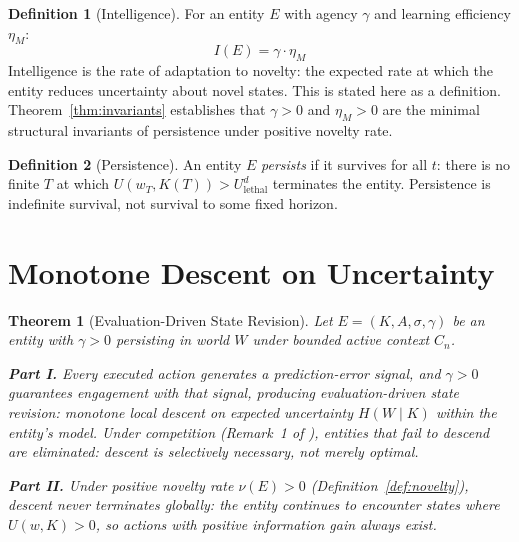 \documentclass[11pt]{article}
\newtheorem{theorem}{Theorem}
\theoremstyle{definition}
\newtheorem{definition}{Definition}
\theoremstyle{remark}
\begin{document}
\begin{definition}[Intelligence]
\label{def:intelligence}
For an entity $E$ with agency $\gamma$ and learning efficiency $\eta_M$:
\[
I(E) = \gamma \cdot \eta_M
\]
Intelligence is the rate of adaptation to novelty: the expected rate at
which the entity reduces uncertainty about novel states. This is stated
here as a definition. Theorem~\ref{thm:invariants} establishes that
$\gamma > 0$ and $\eta_M > 0$ are the minimal structural invariants
of persistence under positive novelty rate.
\end{definition}

\begin{definition}[Persistence]
\label{def:persistence}
An entity $E$ \emph{persists} if it survives for all $t$: there is no
finite $T$ at which $U(w_T, K(T)) > U_{\mathrm{lethal}}^d$ terminates
the entity. Persistence is indefinite survival, not survival to some
fixed horizon.
\end{definition}

\section{Monotone Descent on Uncertainty}
\label{sec:descent}

\begin{theorem}[Evaluation-Driven State Revision]
\label{thm:descent}
Let $E = (K, A, \sigma, \gamma)$ be an entity with $\gamma > 0$ persisting in
world $W$ under bounded active context $C_n$.

\textbf{Part I.} Every executed action generates a prediction-error
signal, and $\gamma > 0$ guarantees engagement with that signal,
producing evaluation-driven state revision: monotone local descent on
expected uncertainty $H(W \mid K)$ within the entity's model. Under
competition (Remark~1 of \cite{McCarthy2026a}), entities that fail to
descend are eliminated: descent is selectively necessary, not merely
optimal.

\textbf{Part II.} Under positive novelty rate $\nu(E) > 0$
(Definition~\ref{def:novelty}), descent never terminates globally:
the entity continues to encounter states where $U(w,K) > 0$, so
actions with positive information gain always exist.
\end{theorem}
\end{document}
